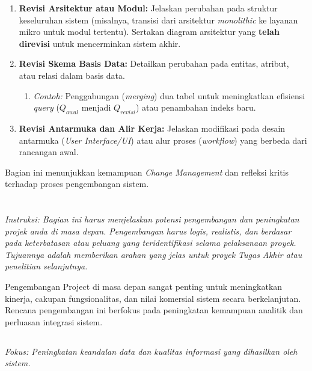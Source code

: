 \documentclass{elsinta}
\begin{document}
\begin{enumerate}
    \item \textbf{Revisi Arsitektur atau Modul:} Jelaskan perubahan pada struktur keseluruhan sistem (misalnya, transisi dari arsitektur \textit{monolithic} ke layanan mikro untuk modul tertentu). Sertakan diagram arsitektur yang \textbf{telah direvisi} untuk mencerminkan sistem akhir.
    \item \textbf{Revisi Skema Basis Data:} Detailkan perubahan pada entitas, atribut, atau relasi dalam basis data.
    \begin{enumerate}
        \item \textit{Contoh:} Penggabungan (\textit{merging}) dua tabel untuk meningkatkan efisiensi \textit{query} ($Q_{awal}$ menjadi $Q_{revisi}$) atau penambahan indeks baru.
    \end{enumerate}
    \item \textbf{Revisi Antarmuka dan Alir Kerja:} Jelaskan modifikasi pada desain antarmuka (\textit{User Interface/UI}) atau alur proses (\textit{workflow}) yang berbeda dari rancangan awal.
\end{enumerate}
Bagian ini menunjukkan kemampuan \textit{Change Management} dan refleksi kritis terhadap proses pengembangan sistem.




\section{\FutureDevelopmentTitle}

\textit{Instruksi: Bagian ini harus menjelaskan potensi pengembangan dan peningkatan projek anda di masa depan. Pengembangan harus logis, realistis, dan berdasar pada keterbatasan atau peluang yang teridentifikasi selama pelaksanaan proyek. Tujuannya adalah memberikan arahan yang jelas untuk proyek Tugas Akhir atau penelitian selanjutnya.}

Pengembangan Project  di masa depan sangat penting untuk meningkatkan kinerja, cakupan fungsionalitas, dan nilai komersial sistem secara berkelanjutan. Rencana pengembangan ini berfokus pada peningkatan kemampuan analitik dan perluasan integrasi sistem.

\subsection{\DataAccuracyTitle}
\textit{Fokus: Peningkatan keandalan data dan kualitas informasi yang dihasilkan oleh sistem.}
\end{document}
